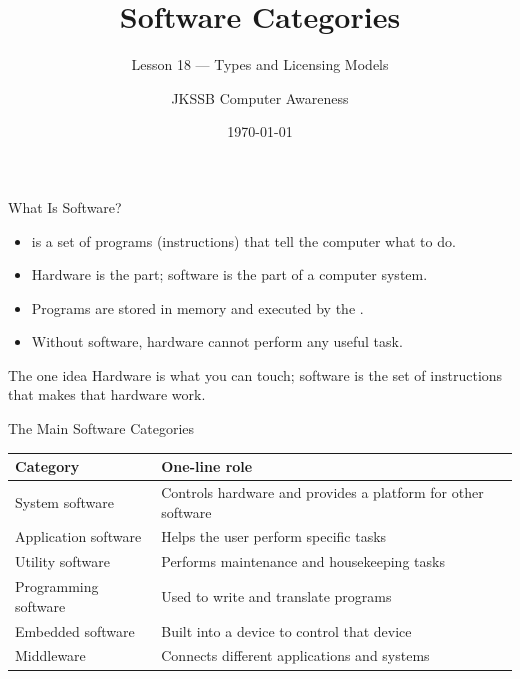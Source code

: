 \documentclass[aspectratio=169]{beamer}
\title{Software Categories}
\subtitle{Lesson 18 --- Types and Licensing Models}
\author{JKSSB Computer Awareness}
\date{\today}
\begin{document}
\frame{\titlepage}

\begin{frame}{What Is Software?}
  \begin{itemize}
    \item {} is a set of programs (instructions) that tell the
      computer what to do.
    \item Hardware is the  part; software is the
       part of a computer system.
    \item Programs are stored in memory and executed by the .
    \item Without software, hardware cannot perform any useful task.
  \end{itemize}
  \begin{block}{The one idea}
    Hardware is what you can touch; software is the set of instructions that
    makes that hardware work.
  \end{block}
\end{frame}

\begin{frame}{The Main Software Categories}
  \begin{center}
    \begin{tabular}{p{}p{}}
      \toprule
      \textbf{Category} & \textbf{One-line role} \\
      \midrule
      System software & Controls hardware and provides a platform for other software \\
      Application software & Helps the user perform specific tasks \\
      Utility software & Performs maintenance and housekeeping tasks \\
      Programming software & Used to write and translate programs \\
      Embedded software & Built into a device to control that device \\
      Middleware & Connects different applications and systems \\
      \bottomrule
    \end{tabular}
  \end{center}
  \vspace{0.2cm}
\end{frame}
\end{document}
